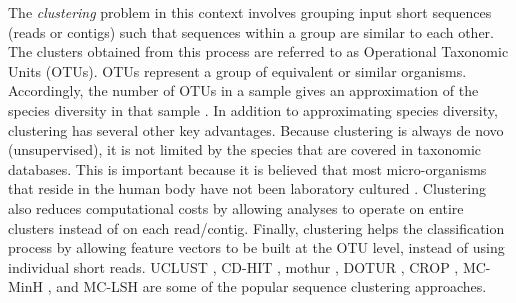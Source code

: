 The \emph{clustering} problem in this context  involves grouping input short sequences (reads or contigs)   such that sequences 
within a group are similar to each other. The clusters 
obtained from this process are referred to 
as Operational Taxonomic Units (OTUs). OTUs represent a 
group of equivalent or similar organisms. Accordingly, the 
number of OTUs in a sample gives an approximation of the 
species diversity in that sample  \cite{schloss2009introducing,schloss2005introducing,sun2009esprit}.
In addition to approximating species diversity, clustering has several other key advantages. Because 
clustering is always de novo (unsupervised), it 
is not limited by the species that are 
covered in taxonomic databases. This is  important 
because it is believed that most micro-organisms that reside 
in the human body have not been laboratory cultured \cite{handelsman04}. Clustering also reduces computational 
costs by allowing analyses to operate on entire clusters instead of 
on each read/contig. Finally, clustering helps 
the classification process by allowing feature vectors to be built
at the OTU level, instead of using individual short reads. UCLUST \cite{Edgar10}, CD-HIT \cite{Li01072006}, mothur \cite{schloss2009introducing}, DOTUR \cite{schloss2005introducing}, CROP \cite{Hao01032011}, MC-MinH \cite{sdm2013a}, and 
MC-LSH \cite{bibm2012} are some of the popular sequence clustering approaches. 

